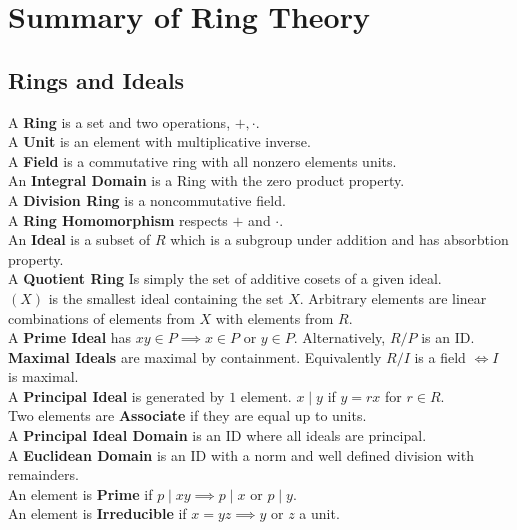\section{Summary of Ring Theory}
\subsection{Rings and Ideals}
\begin{definition}[Rings]
	A \textbf{Ring} is a set and two operations, \(+, \cdot\).\\
	A \textbf{Unit} is an element with multiplicative inverse.\\
	A \textbf{Field} is a commutative ring with all nonzero elements units.\\
	An \textbf{Integral Domain} is a Ring with the zero product property.\\
	A \textbf{Division Ring} is a noncommutative field.\\
	A \textbf{Ring Homomorphism} respects \(+\) and \(\cdot\).\\
	An \textbf{Ideal} is a subset of \(R\) which is a subgroup under addition and has absorbtion property.\\
	A \textbf{Quotient Ring} Is simply the set of additive cosets of a given ideal.\\
	\(\left( X \right) \) is the smallest ideal containing the set \(X\). Arbitrary elements are linear combinations of elements from \(X\) with elements from \(R\).\\
	A \textbf{Prime Ideal} has \(xy \in P \implies x \in P \text{ or } y \in P\). Alternatively, \(R / P\) is an ID.\\
	\textbf{Maximal Ideals} are maximal by containment. Equivalently \(R / I\) is a field \(\iff I\)  is maximal.\\
	A \textbf{Principal Ideal} is generated by \(1\) element.
	\(x \mid y\) if \(y = rx\) for \(r \in R\).\\
	Two elements are \textbf{Associate} if they are equal up to units.\\
	A \textbf{Principal Ideal Domain} is an ID where all ideals are principal.\\
	A \textbf{Euclidean Domain} is an ID with a norm and well defined division with remainders.\\
	An element is \textbf{Prime} if \(p \mid xy \implies p \mid x \text{ or } p \mid y\).\\
	An element is \textbf{Irreducible} if \(x = yz \implies y\) or \(z\) a unit.\\

\end{definition}
